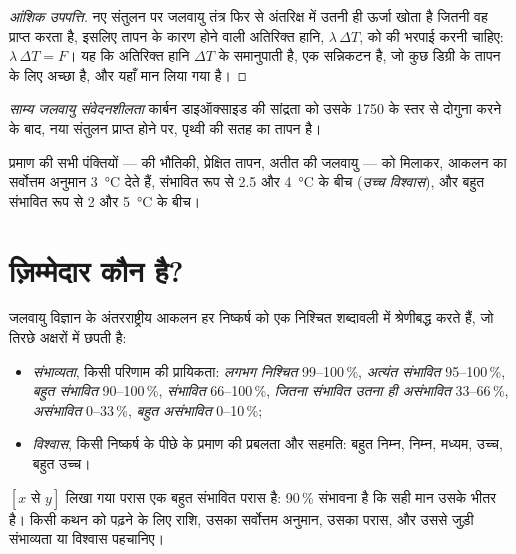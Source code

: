 \begin{proof}[आंशिक उपपत्ति]
नए संतुलन पर जलवायु तंत्र फिर से अंतरिक्ष में उतनी ही ऊर्जा खोता है
जितनी वह प्राप्त करता है, इसलिए तापन के कारण होने वाली अतिरिक्त हानि, $\lambda\,\Delta T$, को
 की भरपाई करनी चाहिए: $\lambda\,\Delta T = F$। यह कि अतिरिक्त हानि
$\Delta T$ के समानुपाती है, एक सन्निकटन है, जो कुछ डिग्री के तापन के लिए अच्छा है,
और यहाँ मान लिया गया है।
\end{proof}

\begin{definition}\label{def:g12:climate-change:ecs}
\emph{साम्य जलवायु संवेदनशीलता}
कार्बन डाइऑक्साइड की सांद्रता को उसके 1750 के स्तर से दोगुना करने के बाद,
नया संतुलन प्राप्त होने पर, पृथ्वी की सतह का तापन है।
\end{definition}

\begin{proposition}\label{prop:g12:climate-change:ecs}
प्रमाण की सभी पंक्तियों ---  की भौतिकी,
प्रेक्षित तापन, अतीत की जलवायु --- को मिलाकर, आकलन  का
सर्वोत्तम अनुमान \qty{3}{\degreeCelsius} देते हैं, संभावित रूप से
2.5 और \qty{4}{\degreeCelsius} के बीच (\emph{उच्च विश्वास}), और बहुत
संभावित रूप से 2 और \qty{5}{\degreeCelsius} के बीच।
\end{proposition}

\section{ज़िम्मेदार कौन है?}

\begin{method}\label{met:g12:climate-change:language}
जलवायु विज्ञान के अंतरराष्ट्रीय आकलन हर निष्कर्ष को एक निश्चित शब्दावली में श्रेणीबद्ध करते हैं,
जो तिरछे अक्षरों में छपती है:
\begin{itemize}
  \item \emph{संभाव्यता}, किसी परिणाम की प्रायिकता:
        \emph{लगभग निश्चित} 99--100\,\%, \emph{अत्यंत संभावित}
        95--100\,\%, \emph{बहुत संभावित} 90--100\,\%, \emph{संभावित}
        66--100\,\%, \emph{जितना संभावित उतना ही असंभावित} 33--66\,\%,
        \emph{असंभावित} 0--33\,\%, \emph{बहुत असंभावित} 0--10\,\%;
  \item \emph{विश्वास}, किसी निष्कर्ष के पीछे के प्रमाण की प्रबलता और
        सहमति: बहुत निम्न, निम्न, मध्यम, उच्च, बहुत उच्च।
\end{itemize}
$[x \text{ से } y]$ लिखा गया परास एक बहुत संभावित परास है: 90\,\%
संभावना है कि सही मान उसके भीतर है। किसी कथन को पढ़ने के लिए
राशि, उसका सर्वोत्तम अनुमान, उसका परास, और उससे जुड़ी संभाव्यता या
विश्वास पहचानिए।
\end{method}

